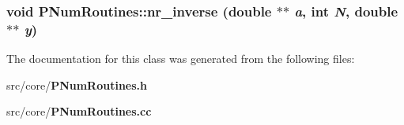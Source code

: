 \subsubsection{\setlength{\rightskip}{0pt plus 5cm}void PNum\-Routines::nr\_\-inverse (double $\ast$$\ast$ {\em a}, int {\em N}, double $\ast$$\ast$ {\em y})\hspace{0.3cm}{\tt  [static]}}\label{classPNumRoutines_d59b7f99506568814b7e9f7201384caa}




The documentation for this class was generated from the following files:\begin{CompactItemize}
\item 
src/core/{\bf PNum\-Routines.h}\item 
src/core/{\bf PNum\-Routines.cc}\end{CompactItemize}
